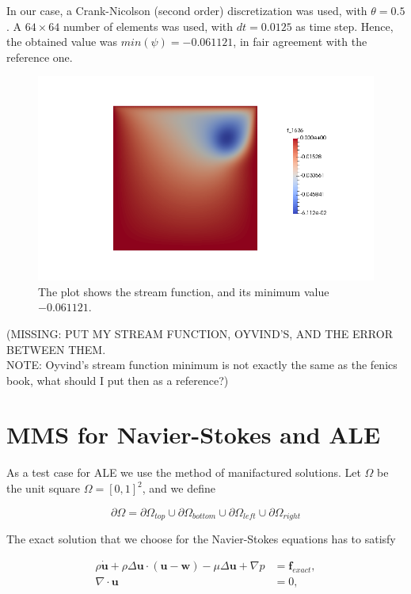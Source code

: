 \documentclass[11pt,a4paper,titlepage]{report}
\begin{document}
In our case, a Crank-Nicolson (second order) discretization was used, with $\theta = 0.5$. A $64 \times 64$ number of elements was used, with $dt = 0.0125$ as time step. Hence, the obtained value was $min(\psi) = -0.061 121$, in fair agreement with the reference one. \\

\vspace{-.3cm}
\begin{figure}[ht]
\centering
\includegraphics[width=\textwidth]{images/mine.png}
\vspace{-1cm}
\caption{The plot shows the stream function, and its minimum value $-0.061 121$.}
\end{figure}

(MISSING: PUT MY STREAM FUNCTION, OYVIND'S, AND THE ERROR BETWEEN THEM. \\
NOTE: Oyvind's stream function minimum is not exactly the same as the fenics book, what should I put then as a reference?)

\newpage

\section{MMS for Navier-Stokes and ALE}
As a test case for ALE we use the method of manifactured solutions. Let $\Omega$ be the unit square $\Omega = [0,1]^2$, and we define

\[
\partial \Omega = \partial \Omega_{top} \cup \partial \Omega_{bottom} \cup \partial \Omega_{left} \cup \partial \Omega_{right}
\]

The exact solution that we choose for the Navier-Stokes equations has to satisfy

\begin{align}
\rho \dot{\mathbf{u}} + \rho \Delta \mathbf{u} \cdot (\mathbf{u} - \mathbf{w}) - \mu \Delta \mathbf{u} +  \nabla p &= \mathbf{f}_{exact}, \\
\nabla \cdot \mathbf{u} &= 0,
\end{align}
\end{document}
